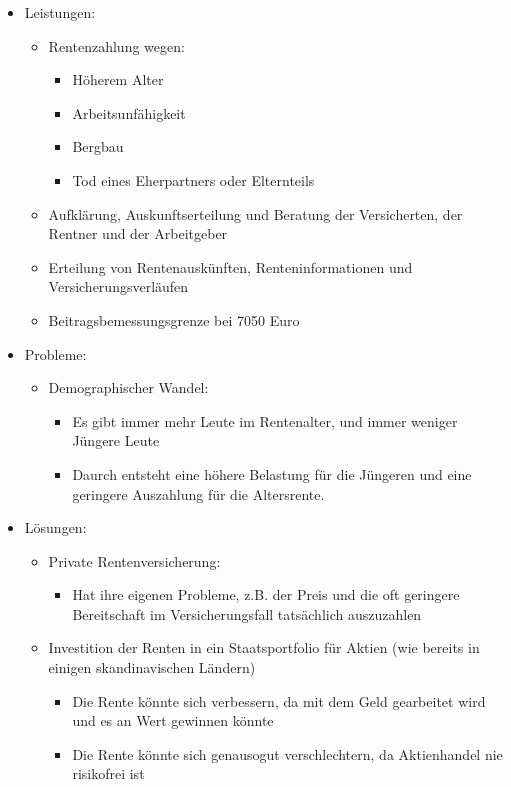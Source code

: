 \documentclass[a4paper, 12pt]{report}
\begin{document}
\begin{itemize}
    \item Leistungen:
        \begin{itemize}
            \item Rentenzahlung wegen:
                \begin{itemize}
                    \item Höherem Alter
                    \item Arbeitsunfähigkeit
                    \item Bergbau
                    \item Tod eines Eherpartners oder Elternteils
                \end{itemize}
            \item Aufklärung, Auskunftserteilung und Beratung der Versicherten, 
                der Rentner und der Arbeitgeber
            \item Erteilung von Rentenauskünften, Renteninformationen und 
                Versicherungsverläufen
            \item Beitragsbemessungsgrenze bei 7050 Euro
        \end{itemize}
    \item Probleme:
        \begin{itemize}
            \item Demographischer Wandel:
                \begin{itemize}
                    \item Es gibt immer mehr Leute im Rentenalter, und immer 
                        weniger Jüngere Leute
                    \item Daurch entsteht eine höhere Belastung für die Jüngeren
                        und eine geringere Auszahlung für die Altersrente. 
                \end{itemize}
        \end{itemize}
    \item Lösungen: 
        \begin{itemize}
            \item Private Rentenversicherung: 
                \begin{itemize}
                    \item Hat ihre eigenen Probleme, z.B. der Preis und die oft 
                        geringere Bereitschaft im Versicherungsfall tatsächlich 
                        auszuzahlen
                \end{itemize}
            \item Investition der Renten in ein Staatsportfolio für Aktien (wie 
                bereits in einigen skandinavischen Ländern)
                \begin{itemize}
                    \item Die Rente könnte sich verbessern, da mit dem Geld 
                        gearbeitet wird und es an Wert gewinnen könnte
                    \item Die Rente könnte sich genausogut verschlechtern, da
                        Aktienhandel nie risikofrei ist
                \end{itemize}
        \end{itemize}
\end{itemize}
\end{document}
